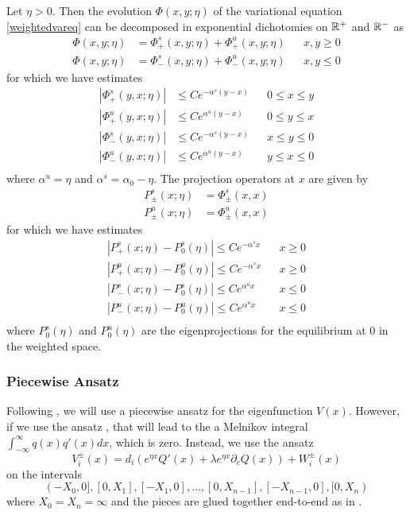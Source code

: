 \documentclass[thesis.tex]{subfiles}
\begin{document}
\begin{lemma}\label{weighteddichotomy}
Let $\eta > 0$. Then the evolution $\Phi(x, y; \eta)$ of the variational equation \cref{weightedvareq} can be decomposed in exponential dichotomies on $\mathbb{R}^+$ and $\mathbb{R}^-$ as
\begin{align*}
\Phi(x, y; \eta) &= \Phi^s_+(x, y; \eta) + \Phi^u_+(x, y; \eta) && x, y \geq 0 \\
\Phi(x, y; \eta) &= \Phi^s_-(x, y; \eta) + \Phi^u_-(x, y; \eta) && x, y \leq 0 
\end{align*}
for which we have estimates
\begin{align*}
|\Phi^s_+(y,x; \eta)| &\leq Ce^{-\alpha^s(y-x)} && 0 \leq x \leq y \\
|\Phi^u_+(y,x; \eta)| &\leq Ce^{\alpha^u(y-x)}  && 0 \leq y \leq x \\
|\Phi^s_-(y,x; \eta)| &\leq Ce^{-\alpha^s(y-x)} && x \leq y \leq 0 \\
|\Phi^u_-(y,x; \eta)| &\leq Ce^{\alpha^u(y-x)}  && y \leq x \leq 0 \\
\end{align*}
where $\alpha^u = \eta$ and $\alpha^s = \alpha_0 - \eta$. The projection operators at $x$ are given by
\begin{align*}
P^s_\pm(x; \eta) &= \Phi^s_\pm(x,x)\\
P^u_\pm(x; \eta) &= \Phi^u_\pm(x,x)
\end{align*}
for which we have estimates
\begin{align*}
|P^s_+(x; \eta) - P_0^s(\eta)| \leq Ce^{-\alpha^s x} && x \geq 0 \\
|P^u_+(x; \eta) - P_0^u(\eta)| \leq Ce^{-\alpha^s x} && x \geq 0 \\
|P^s_-(x; \eta) - P_0^s(\eta)| \leq Ce^{\alpha^u x} && x \leq 0 \\
|P^u_-(x; \eta) - P_0^u(\eta)| \leq Ce^{\alpha^u x} && x \leq 0 \\
\end{align*}
where $P_0^s(\eta)$ and $P_0^u(\eta)$ are the eigenprojections for the equilibrium at 0 in the weighted space. 
\end{lemma}

\subsubsection{Piecewise Ansatz}

Following \cite{Sandstede1998}, we will use a piecewise ansatz for the eigenfunction $V(x)$. However, if we use the ansatz \cite[(3.5)]{Sandstede1998}, that will lead to the a Melnikov integral $\int_{-\infty}^\infty q(x) q'(x) dx$, which is zero. Instead, we use the ansatz
\begin{equation}\label{weightedansatz}
V_i^\pm(x) = d_i (e^{\eta x} Q'(x) + \lambda e^{\eta x} \partial_c Q(x)) + W_i^\pm(x)
\end{equation}
on the intervals 
\[
(-X_0, 0], [0, X_1], [-X_1, 0], \dots, [0, X_{n-1}], [-X_{n-1}, 0], [0, X_n) 
\]
where $X_0 = X_n = \infty$ and the pieces are glued together end-to-end as in \cite{Sandstede1998}.
\end{document}
